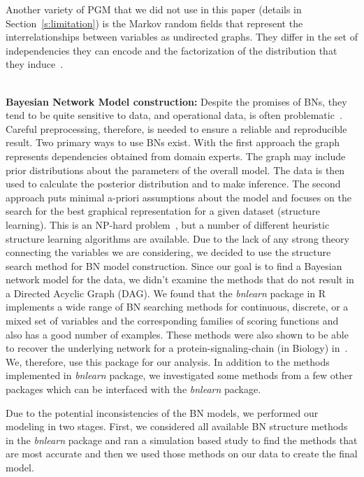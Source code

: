 \documentclass[smallextended]{svjour3}       %
\begin{document}
Another variety of PGM that we did not use in this paper 
(details in Section~\ref{s:limitation}) is the Markov random
fields that represent the interrelationships between variables 
as undirected graphs. They differ in the set of
independencies they can encode and the factorization of the
distribution that they induce~\cite{koller2009probabilistic}.

\noindent\\
\textbf{Bayesian Network Model construction:}
Despite the promises of BNs, they tend to be quite sensitive to data,
and operational data, is often problematic~\cite{M14,zmz15}. 
Careful preprocessing, therefore, is needed to ensure a 
reliable and reproducible result. Two primary ways to use BNs exist. With the first
approach the graph represents dependencies obtained from domain experts.
The graph may include prior distributions
about the parameters of the overall model. The data is then used to
calculate the posterior distribution and to make inference. The
second approach puts minimal a-priori assumptions about the model
and focuses on the search for the best graphical representation for a given dataset
(structure learning). This is an NP-hard problem~\cite{chickering1996learning},
but a number of different heuristic structure learning algorithms are
available. Due to the lack of any strong theory connecting the variables we are considering,
we decided to use the structure search method for BN model construction.
Since our goal is to find a Bayesian network model for the data, we didn't
examine the methods that do not result in a Directed Acyclic Graph
(DAG). We found that the \textit{bnlearn} package in R implements a wide range of BN searching
methods for continuous, discrete, or a mixed set of variables and
the corresponding families of scoring functions and also has a good number of examples.
These methods were also shown to be able to recover the underlying network for a 
protein-signaling-chain (in Biology) in~\cite{bnppt}. We, therefore,
use this package for our analysis. In addition to the methods
implemented in \textit{bnlearn} package, we investigated some 
methods from a few other packages which can be interfaced with
the \textit{bnlearn} package.

Due to the potential inconsistencies of the BN models, we performed our 
modeling in two stages. First, we considered all available BN structure 
methods in the \textit{bnlearn} package and ran a simulation based study to 
find the methods that are most accurate and then we used those methods on our 
data to create the final model.
\end{document}
